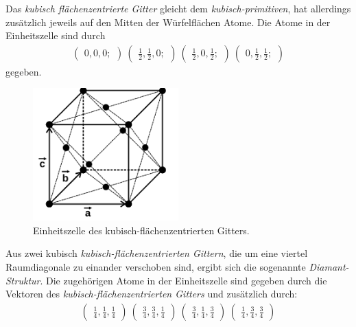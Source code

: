 Das \textit{kubisch flächenzentrierte Gitter} gleicht dem
\textit{kubisch-primitiven}, hat
allerdings zusätzlich jeweils auf den Mitten der Würfelflächen Atome.
Die Atome in der Einheitszelle sind durch
\begin{align}
\label{eqn:3*}
\begin{pmatrix}
0, 0, 0;
\end{pmatrix}\
\begin{pmatrix}
\frac{1}{2}, \frac{1}{2}, 0;
\end{pmatrix}\
\begin{pmatrix}
\frac{1}{2}, 0, \frac{1}{2};
\end{pmatrix}\
\begin{pmatrix}
0, \frac{1}{2}, \frac{1}{2};
\end{pmatrix}
\end{align}
gegeben.

\begin{figure}[hhh]
\centering
\includegraphics[width=0.5\textwidth]{abbildungen/fcc.png}
\caption{Einheitszelle des kubisch-flächenzentrierten Gitters.\cite{sample}}
\label{fig:fcc}
\end{figure}

Aus zwei kubisch \textit{kubisch-flächenzentrierten Gittern}, die
um eine viertel Raumdiagonale zu einander verschoben sind, ergibt sich die sogenannte
\textit{Diamant-Struktur}.
Die zugehörigen Atome in der Einheitszelle sind gegeben durch die
Vektoren des \textit{kubisch-flächenzentrierten Gitters}
und zusätzlich durch:
\begin{align}
\label{eqn:4*}
\begin{pmatrix}
\frac{1}{4}, \frac{1}{4}, \frac{1}{4}
\end{pmatrix}\
\begin{pmatrix}
\frac{3}{4}, \frac{3}{4}, \frac{1}{4}
\end{pmatrix}\
\begin{pmatrix}
\frac{3}{4}, \frac{1}{4}, \frac{3}{4}
\end{pmatrix}\
\begin{pmatrix}
\frac{1}{4}, \frac{3}{4}, \frac{3}{4}
\end{pmatrix}
\end{align}

